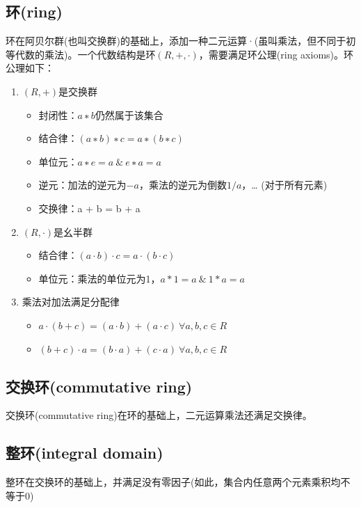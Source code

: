 \documentclass[12pt]{article}
\begin{document}
\subsection{环(ring)}
环在阿贝尔群(也叫交换群)的基础上，添加一种二元运算·(虽叫乘法，但不同于初等代数的乘法)。一个代数结构是环$(R, +, ·)$，需要满足环公理(ring axioms)。环公理如下：
\begin{enumerate}
\setlength{\itemsep}{0pt}
\setlength{\parsep}{0pt}
\setlength{\parskip}{0pt}
\item $(R, +)$是交换群
	\begin{itemize}
	\setlength{\itemsep}{0pt}
	\setlength{\parsep}{0pt}
	\setlength{\parskip}{0pt}
	\item 封闭性：$a ∗ b$仍然属于该集合
	\item 结合律：$(a ∗ b) ∗ c = a ∗ (b ∗ c)$
	\item 单位元：$a ∗ e = a   \ \& \  e ∗ a = a$
	\item 逆元：加法的逆元为$-a$，乘法的逆元为倒数$1/a$，… (对于所有元素)
	\item 交换律：a + b = b + a
	\end{itemize}

\item $(R, ·)$是幺半群
	\begin{itemize}
	\setlength{\itemsep}{0pt}
	\setlength{\parsep}{0pt}
	\setlength{\parskip}{0pt}
	\item 结合律：$(a ⋅ b) ⋅ c = a ⋅ (b ⋅ c)$
	\item 单位元：乘法的单位元为1，$a * 1 = a   \ \& \  1 * a = a$
	\end{itemize}
	
\item 乘法对加法满足分配律
	\begin{itemize}
	\setlength{\itemsep}{0pt}
	\setlength{\parsep}{0pt}
	\setlength{\parskip}{0pt}
	\item $a ⋅ (b + c) = (a ⋅ b) + (a ⋅ c) \ \forall a, b, c \in R$
	\item $(b + c) ⋅ a = (b ⋅ a) + (c ⋅ a) \ \forall a, b, c \in R $
	\end{itemize}
\end{enumerate}

\subsection{交换环(commutative ring)}
交换环(commutative ring)在环的基础上，二元运算乘法还满足交换律。

\subsection{整环(integral domain)}
整环在交换环的基础上，并满足没有零因子(如此，集合内任意两个元素乘积均不等于0)
\end{document}
